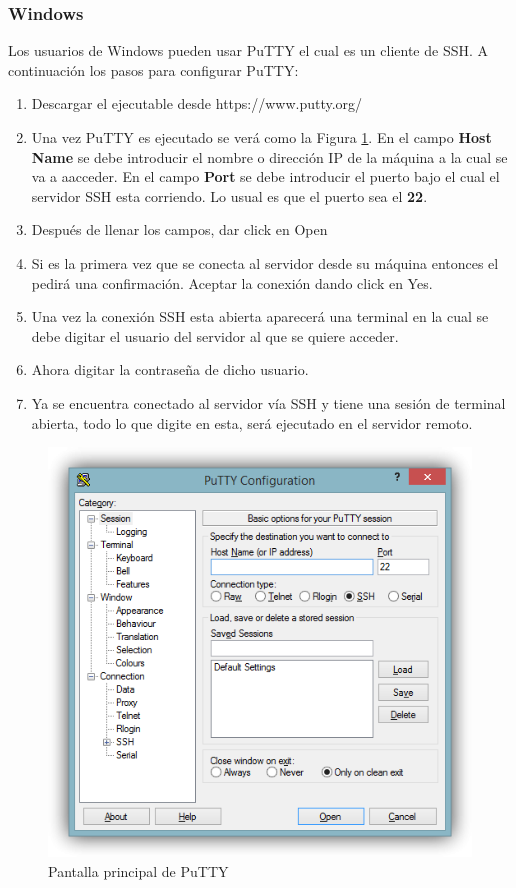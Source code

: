 \documentclass[12pt]{article}
\begin{document}
\subsubsection{Windows}
Los usuarios de Windows pueden usar PuTTY el cual es un cliente de SSH. A continuaci\'on los pasos para configurar PuTTY:
\begin{enumerate}
    \item Descargar el ejecutable desde https://www.putty.org/
    \item Una vez PuTTY es ejecutado se ver\'a como la Figura \ref{putty1}. En el campo \textbf{Host Name} se debe introducir el nombre o direcci\'on IP de
          la m\'aquina a la cual se va a aacceder. En el campo \textbf{Port} se debe introducir el puerto bajo el cual el servidor SSH esta corriendo. Lo usual es que el puerto sea el \textbf{22}.
    \item Despu\'es de llenar los campos, dar click en Open
    \item Si es la primera vez que se conecta al servidor desde su m\'aquina entonces el pedir\'a una confirmaci\'on. Aceptar la conexi\'on dando click en Yes.
    \item Una vez la conexi\'on SSH esta abierta aparecer\'a una terminal en la cual se debe digitar el usuario del servidor al que se quiere acceder.
    \item Ahora digitar la contrase\~na de dicho usuario.
    \item Ya se encuentra conectado al servidor v\'ia SSH y tiene una sesi\'on de terminal abierta, todo lo que digite en esta, ser\'a ejecutado en el servidor remoto.
\end{enumerate}
\begin{figure}[]
    \centering
    \includegraphics{putty-tutorial-foto-1.png}
    \caption{Pantalla principal de PuTTY}
    \label{putty1}
\end{figure}
\end{document}
